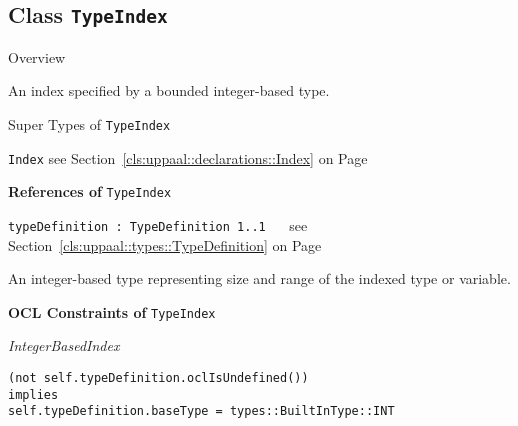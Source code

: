 \subsection{Class \bfseries \texttt{TypeIndex}\normalfont}
\label{cls:uppaal::declarations::TypeIndex} 
	
	\begin{longdescription}
		\item[Overview] 		
				

	

		An index specified by a bounded integer-based type.		
		\item[Super Types of \texttt{TypeIndex}] ~
			\begin{longdescription}
				\item[\texttt{Index}] see Section~\ref{cls:uppaal::declarations::Index} on Page~\pageref{cls:uppaal::declarations::Index}						\end{longdescription}
		
	
			\item[\textbf{References of} \texttt{TypeIndex}] ~
			\begin{longdescription}
	\item[\texttt{typeDefinition : TypeDefinition 	\symbol{"5B}1..1\symbol{"5D}
}] ~
	see Section~\ref{cls:uppaal::types::TypeDefinition} on Page~\pageref{cls:uppaal::types::TypeDefinition}
	
	\nopagebreak
		
				

	

		An integer-based type representing size and range of the indexed type or variable.		
			\end{longdescription}
			\item[\textbf{OCL Constraints of} \texttt{TypeIndex}] ~
			\begin{longdescription}
	\item[\small\textit{IntegerBasedIndex}] ~ 
	\nopagebreak
	
		\begin{lstlisting}[breaklines=true]
(not self.typeDefinition.oclIsUndefined())
implies
self.typeDefinition.baseType = types::BuiltInType::INT		\end{lstlisting}
			\end{longdescription}
	
	\end{longdescription}
	

